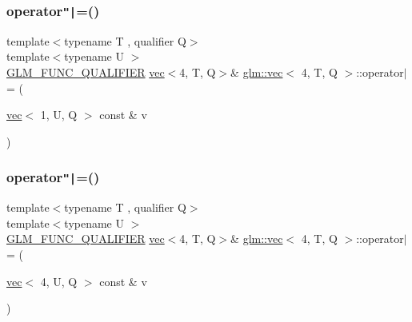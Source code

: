 \mbox{\label{structglm_1_1vec_3_014_00_01_t_00_01_q_01_4_a3d9704513aa8df8d05bc30d20dd6bc71}} 
\subsubsection{\texorpdfstring{operator\texttt{"|}=()}{operator|=()}\hspace{0.1cm}{\footnotesize\ttfamily [5/6]}}
{\footnotesize\ttfamily template$<$typename T , qualifier Q$>$ \\
template$<$typename U $>$ \\
\mbox{\hyperlink{setup_8hpp_a33fdea6f91c5f834105f7415e2a64407}{G\+L\+M\+\_\+\+F\+U\+N\+C\+\_\+\+Q\+U\+A\+L\+I\+F\+I\+ER}} \mbox{\hyperlink{structglm_1_1vec}{vec}}$<$4, T, Q$>$\& \mbox{\hyperlink{structglm_1_1vec}{glm\+::vec}}$<$ 4, T, Q $>$\+::operator$\vert$= (\begin{DoxyParamCaption}\item[{\mbox{\hyperlink{structglm_1_1vec}{vec}}$<$ 1, U, Q $>$ const \&}]{v }\end{DoxyParamCaption})}

\mbox{\label{structglm_1_1vec_3_014_00_01_t_00_01_q_01_4_aea8bc26beedb4f4fbb6a4d0ad4e02a86}} 
\subsubsection{\texorpdfstring{operator\texttt{"|}=()}{operator|=()}\hspace{0.1cm}{\footnotesize\ttfamily [6/6]}}
{\footnotesize\ttfamily template$<$typename T , qualifier Q$>$ \\
template$<$typename U $>$ \\
\mbox{\hyperlink{setup_8hpp_a33fdea6f91c5f834105f7415e2a64407}{G\+L\+M\+\_\+\+F\+U\+N\+C\+\_\+\+Q\+U\+A\+L\+I\+F\+I\+ER}} \mbox{\hyperlink{structglm_1_1vec}{vec}}$<$4, T, Q$>$\& \mbox{\hyperlink{structglm_1_1vec}{glm\+::vec}}$<$ 4, T, Q $>$\+::operator$\vert$= (\begin{DoxyParamCaption}\item[{\mbox{\hyperlink{structglm_1_1vec}{vec}}$<$ 4, U, Q $>$ const \&}]{v }\end{DoxyParamCaption})}




